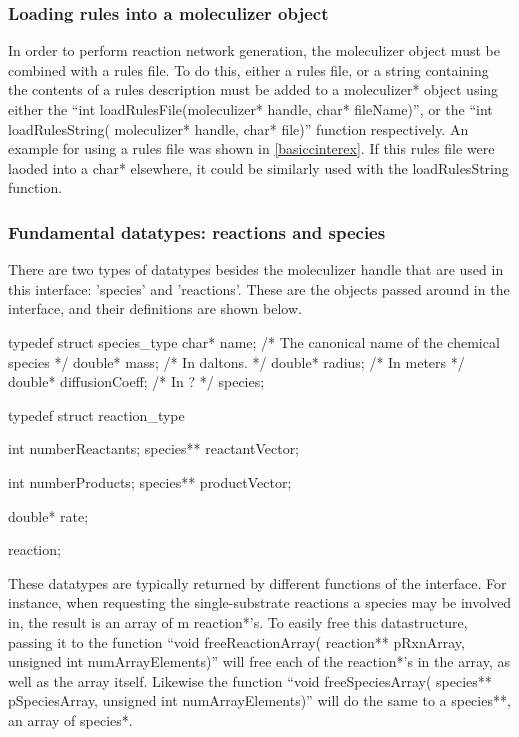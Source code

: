 \subsubsection{Loading rules into a moleculizer object}
In order to perform reaction network generation, the moleculizer
object must be combined with a rules file.  To do this, either a rules
file, or a string containing the contents of a rules description must
be added to a moleculizer* object using either the ``int
loadRulesFile(moleculizer* handle, char* fileName)'', or the ``int
loadRulesString( moleculizer* handle, char* file)'' function
respectively.  An example for using a rules file was shown in
\ref{basiccinterex}.  If this rules file were laoded into a char*
elsewhere, it could be similarly used with the loadRulesString
function.

\subsubsection{Fundamental datatypes: reactions and species}
There are two types of datatypes besides the moleculizer handle that are used
in this interface: 'species' and 'reactions'.  These are the objects
passed around in the interface, and their definitions are shown below.

\begin{ExampleC}[caption=Fundamental data-type definitions,
  label=speciesreactiondef]

  typedef struct species_type
    {
      char* name; /* The canonical name of the chemical species */
      double* mass;  /* In daltons. */
      double* radius; /* In meters */ 
      double* diffusionCoeff; /* In ? */
    } species;
    
    typedef struct reaction_type
    {
        int numberReactants;
        species** reactantVector;
        
        int numberProducts;
        species** productVector;
        
        double* rate;
        
    } reaction;

\end{ExampleC}

These datatypes are typically returned by different functions of the
interface.  For instance, when requesting the single-substrate
reactions a species may be involved in, the result is an array of m
reaction*'s.  To easily free this datastructure, passing it to the
function ``void freeReactionArray( reaction** pRxnArray, unsigned int
numArrayElements)'' will free each of the reaction*'s in the array, as
well as the array itself.  Likewise the function ``void
freeSpeciesArray( species** pSpeciesArray, unsigned int
numArrayElements)'' will do the same to a species**, an array of
species*.  


